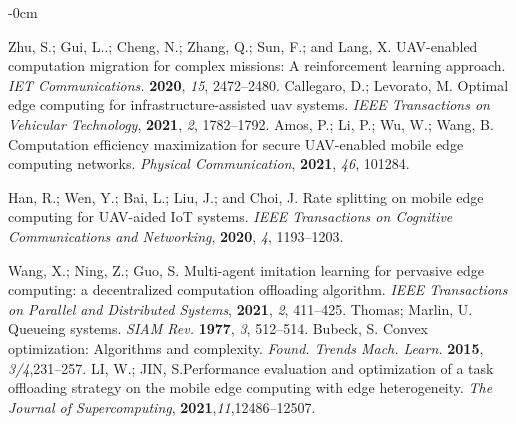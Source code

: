 \documentclass[journal,article,submit,pdftex,moreauthors]{Definitions/mdpi}
\begin{document}
\begin{adjustwidth}{-\extralength}{0cm}
\begin{thebibliography}{999}
Zhu, S.; Gui, L..; Cheng, N.; Zhang, Q.; Sun, F.; and Lang, X. UAV-enabled computation migration for complex missions: A reinforcement learning approach.  \emph{IET Communications.}  \textbf{2020},  \emph{15}, 2472--2480.
Callegaro, D.; Levorato, M. Optimal edge computing for infrastructure-assisted uav systems.  \emph{IEEE Transactions on Vehicular Technology}, \textbf{2021},  \emph{2},  1782--1792.
Amos, P.; Li, P.; Wu, W.; Wang, B. Computation efficiency maximization for secure UAV-enabled mobile edge computing networks.  \emph{Physical Communication}, \textbf{2021},  \emph{46}, 101284.

Han, R.; Wen, Y.; Bai, L.; Liu, J.; and  Choi, J. Rate splitting on mobile edge computing for UAV-aided IoT systems. \emph{IEEE Transactions on Cognitive Communications and Networking},  \textbf{2020}, \emph{4}, 1193--1203.


Wang, X.; Ning, Z.; Guo, S. Multi-agent imitation learning for pervasive edge computing: a decentralized computation offloading algorithm. \emph{IEEE Transactions on Parallel and Distributed Systems}, \textbf{2021}, \emph{2}, 411--425.
Thomas; Marlin, U. Queueing systems. \emph{SIAM Rev.} \textbf{1977}, \emph{3},
 512--514.
Bubeck, S. Convex optimization: Algorithms and complexity.
\emph{Found. Trends Mach. Learn.} \textbf{2015}, \emph{3/4},231--257.
LI, W.; JIN, S.Performance evaluation and optimization of a task offloading strategy on the mobile edge computing with edge heterogeneity. \emph{The Journal of Supercomputing}, \textbf{2021},\emph{11},12486--12507.

\end{thebibliography}

%



\end{adjustwidth}
\end{document}

